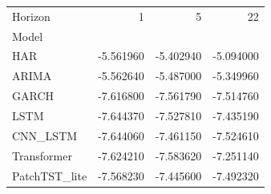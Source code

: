 \begin{tabular}{lrrr}
\toprule
Horizon & 1 & 5 & 22 \\
Model &  &  &  \\
\midrule
HAR & -5.561960 & -5.402940 & -5.094000 \\
ARIMA & -5.562640 & -5.487000 & -5.349960 \\
GARCH & -7.616800 & -7.561790 & -7.514760 \\
LSTM & -7.644370 & -7.527810 & -7.435190 \\
CNN_LSTM & -7.644060 & -7.461150 & -7.524610 \\
Transformer & -7.624210 & -7.583620 & -7.251140 \\
PatchTST_lite & -7.568230 & -7.445600 & -7.492320 \\
\bottomrule
\end{tabular}
